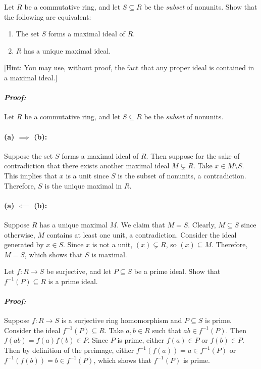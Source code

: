 \documentclass [12pt] {article}
\renewcommand{\it}[1]{\textit{{#1}}}
\newenvironment{problem}{\begin{tcolorbox}[title=Problem,colback=black!5!white,colframe=black!75!black]}{\end{tcolorbox}}
\newenvironment{response}{\begin{responseframe}\vspace{-10pt}\paragraph{\it{Proof:}}}{\end{responseframe}}
\begin{document}
\newpage
\begin{problem}
    Let $R$ be a commutative ring, and let $S\subseteq R$ be the \it{subset} of
    nonunits. Show that the following are equivalent:
    \begin{enumerate}[label=(\alph*)]
        \item The set $S$ forms a maximal ideal of $R$.
        \item $R$ has a unique maximal ideal.
    \end{enumerate}
    \vspace{1em}

    [Hint: You may use, without proof, the fact that any proper ideal is
    contained in a maximal ideal.]
\end{problem}
\begin{response}
    Let $R$ be a commutative ring, and let $S\subseteq R$ be the \it{subset} of
    nonunits.

    \paragraph{(a) $\bm{\implies}$ (b):} Suppose the set $S$ forms a maximal
    ideal of $R$. Then suppose for the sake of contradiction that there exists
    another maximal ideal $M\subsetneq R$. Take $x\in M\setminus S$. This
    implies that $x$ is a unit since $S$ is the subset of nonunits, a
    contradiction. Therefore, $S$ is the unique maximal in $R$.

    \paragraph{(a) $\bm{\impliedby}$ (b):} Suppose $R$ has a unique maximal $M$.
    We claim that $M=S$. Clearly, $M\subseteq S$ since otherwise, $M$ contains
    at least one unit, a contradiction. Consider the ideal generated by $x\in S$.
    Since $x$ is not a unit, $(x)\subsetneq R$, so $(x)\subseteq M$. Therefore,
    $M=S$, which shows that $S$ is maximal.
\end{response}

\newpage
\newcommand{\finv}{f^{-1}}
\begin{problem}
    Let $f:R\to S$ be surjective, and let $P\subseteq S$ be a prime ideal. Show
    that $f^{-1}(P)\subseteq R$ is a prime ideal.
\end{problem}
\begin{response}
    Suppose $f : R\to S$ is a surjective ring homomorphism and $P\subseteq S$ is
    prime. Consider the ideal $\finv(P)\subseteq R$. Take $a,b\in R$ such that
    $ab\in \finv(P)$. Then $f(ab)=f(a)f(b)\in P$. Since $P$ is prime, either
    $f(a)\in P$ or $f(b)\in P$. Then by definition of the preimage, either
    $\finv(f(a))=a\in \finv(P)$ or $\finv(f(b))=b\in \finv(P)$, which shows that
    $\finv(P)$ is prime.
\end{response}
\end{document}
